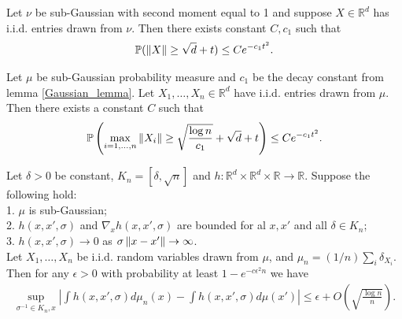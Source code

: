 \begin{lemma} \label{Gaussian_lemma}
    Let $\nu$ be sub-Gaussian with second moment equal to 1 and suppose $X \in \mathbb{R}^d$ has i.i.d. entries drawn from $\nu$. Then there exists constant $C, c_1$ such that
    \begin{align}
        \mathbb{P}(\left\lVert X\right\rVert \geq \sqrt{d} + t) \leq Ce^{-c_1t^2}.
    \end{align}
\end{lemma}
\begin{lemma} \label{max_iid_lemma}
    Let $\mu$ be sub-Gaussian probability measure and $c_1$ be the decay constant from lemma \ref{Gaussian_lemma}. Let $X_1, \dots, X_n \in \mathbb{R}^d$ have i.i.d. entries drawn from $\mu$. Then there exists a constant $C$ such that
    \begin{align}
        \mathbb{P} \left (\max_{i=1,\dots,n}\left\lVert X_i\right\rVert \geq \sqrt{\frac{\log n}{c_1}}+\sqrt{d}+t \right ) \leq Ce^{-c_1t^2}.
    \end{align}
\end{lemma}
\begin{lemma} \label{approx_lemma}
    Let $\delta>0$ be constant, $K_n = [\delta,\sqrt{n}]$ and $h: \mathbb{R}^d \times \mathbb{R}^d \times \mathbb{R} \to \mathbb{R}$. Suppose the following hold: \\
    1. $\mu$ is sub-Gaussian; \\
    2. $h(x,x',\sigma)$ and $\nabla_x h(x,x',\sigma)$ are bounded for al $x,x'$ and all $\delta \in K_n$;\\
    3. $h(x,x',\sigma) \to 0$ as $\sigma\left\lVert x-x'\right\rVert \to \infty$.\\
    Let $X_1,\dots,X_n$ be i.i.d. random variables drawn from $\mu$, and $\mu_n = (1/n)\sum_i \delta_{X_i}$. Then for any $\epsilon > 0$ with probability at least $1 - e^{-c\epsilon^2n}$ we have
    \begin{align}
        \sup_{\sigma^{-1} \in K_n,x} \left|\int h(x,x',\sigma)d\mu_n(x) - \int h(x,x',\sigma)d\mu(x')\right| \leq \epsilon + O\left(\sqrt{\frac{\log n}{n}}\right).
    \end{align}
\end{lemma}

